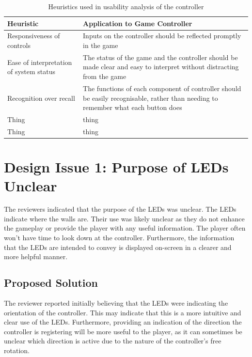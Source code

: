 \documentclass{scrartcl}
\begin{document}
\begin{table}
\centering
\begin{tabular}{| l | p{6cm} |}
\hline
\textbf{Heuristic} & \textbf{Application to Game Controller} \\ \hline
Responsiveness of controls & Inputs on the controller should be reflected promptly in the game \\ \hline
Ease of interpretation of system status & The status of the game and the controller should be made clear and easy to interpret without distracting from the game \\ \hline
Recognition over recall & The functions of each component of controller should be easily recognisable, rather than needing to remember what each button does \\ \hline
Thing & thing \\ \hline
Thing & thing \\ \hline
\end{tabular}
\caption{Heuristics used in usability analysis of the controller}
\label{table:heuristics}
\end{table}

\section{Design Issue 1: Purpose of LEDs Unclear}
The reviewers indicated that the purpose of the LEDs was unclear. The LEDs indicate where the walls are. Their use was likely unclear as they do not enhance the gameplay or provide the player with any useful information. The player often won't have time to look down at the controller. Furthermore, the information that the LEDs are intended to convey is displayed on-screen in a clearer and more helpful manner.

\subsection{Proposed Solution}
The reviewer reported initially believing that the LEDs were indicating the orientation of the controller. This may indicate that this is a more intuitive and clear use of the LEDs. Furthermore, providing an indication of the direction the controller is registering will be more useful to the player, as it can sometimes be unclear which direction is active due to the nature of the controller's free rotation.
\end{document}
